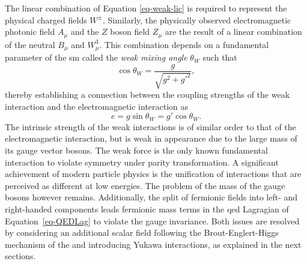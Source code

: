 The linear combination of Equation \ref{eq-weak-lic} is required to represent the physical charged fields $W^{\pm}$. Similarly, the physically observed electromagnetic photonic field $A_{\mu}$ and the $Z$ boson field $Z_{\mu}$ are the result of a linear combination of the neutral $B_{\mu}$ and $W_{\mu}^3$. This combination depends on a fundamental parameter of the \gls{sm} called the \textit{weak mixing angle} $\theta_W$ such that
\begin{equation}\label{eq-weakmixangle}
    \cos\theta_W = \frac{g}{\sqrt{g^2 +g'^2}},
\end{equation}
thereby establishing a connection between the coupling strengths of the weak interaction and the electromagnetic interaction as \[e = g \sin \theta_W = g' \cos\theta_W.\] The intrinsic strength of the weak interactions is of similar order to that of the electromagnetic interaction, but is weak in appearance due to the large mass of its gauge vector bosons. The weak force is the only known fundamental interaction to violate symmetry under parity transformation. A significant achievement of modern particle physics is the unification of interactions that are perceived as different at low energies. The problem of the mass of the gauge bosons however remains. Additionally, the split of fermionic fields into left- and right-handed components leads fermionic mass terms in the \gls{qed} Lagragian of Equation~\ref{eq-QEDLag} to violate the gauge invariance. Both issues are resolved by considering an additional scalar field following the Brout-Englert-Higgs mechanism of the and introducing Yukawa interactions, as explained in the next sections.


